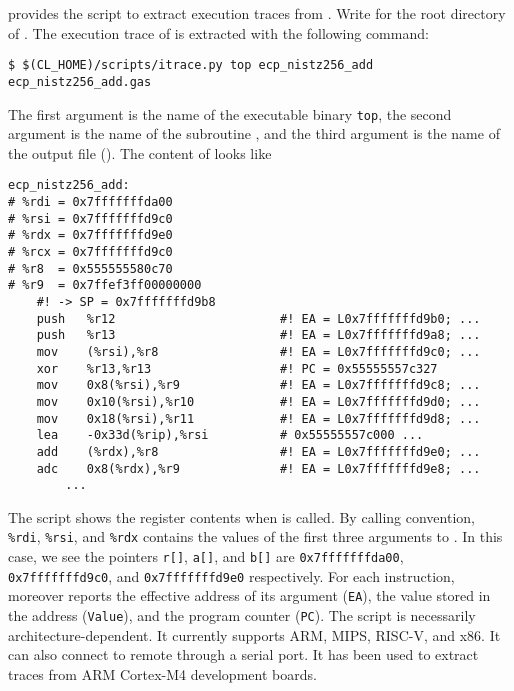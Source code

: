 \documentclass{amsproc}
\begin{document}
\cryptoline provides the \python script \itrace to extract execution
traces from \gdb. Write \cryptolinehome for the root directory of
\cryptoline. The execution trace of \nistzadd is extracted with the
following command:
\begin{verbatim}
$ $(CL_HOME)/scripts/itrace.py top ecp_nistz256_add ecp_nistz256_add.gas
\end{verbatim}
The first argument is the name of the executable binary \texttt{top},
the second argument is the name of the subroutine \nistzadd, and the
third argument is the name of the output file
(\nistzaddgas). The content of \nistzaddgas looks like
\begin{verbatim}
ecp_nistz256_add:
# %rdi = 0x7fffffffda00
# %rsi = 0x7fffffffd9c0
# %rdx = 0x7fffffffd9e0
# %rcx = 0x7fffffffd9c0
# %r8  = 0x555555580c70
# %r9  = 0x7ffef3ff00000000
	#! -> SP = 0x7fffffffd9b8
	push   %r12                       #! EA = L0x7fffffffd9b0; ...
	push   %r13                       #! EA = L0x7fffffffd9a8; ...
	mov    (%rsi),%r8                 #! EA = L0x7fffffffd9c0; ...
	xor    %r13,%r13                  #! PC = 0x55555557c327
	mov    0x8(%rsi),%r9              #! EA = L0x7fffffffd9c8; ...
	mov    0x10(%rsi),%r10            #! EA = L0x7fffffffd9d0; ...
	mov    0x18(%rsi),%r11            #! EA = L0x7fffffffd9d8; ...
	lea    -0x33d(%rip),%rsi          # 0x55555557c000 ...
	add    (%rdx),%r8                 #! EA = L0x7fffffffd9e0; ...
	adc    0x8(%rdx),%r9              #! EA = L0x7fffffffd9e8; ...
        ...
\end{verbatim}
The script \itrace shows the register contents when \nistzadd is
called. By calling convention, \texttt{\%rdi}, \texttt{\%rsi}, and
\texttt{\%rdx} contains the values of the first three arguments to
\nistzadd. In this case, we see the pointers \texttt{r[]},
\texttt{a[]}, and \texttt{b[]} are \texttt{0x7fffffffda00}, 
\texttt{0x7fffffffd9c0}, and \texttt{0x7fffffffd9e0}
respectively. For each instruction, \itrace moreover reports the
effective address of its argument (\texttt{EA}), the value stored in
the address (\texttt{Value}), and the program counter (\texttt{PC}). 
The \itrace script is necessarily architecture-dependent. It currently
supports ARM, MIPS, RISC-V, and x86. It can also connect to remote
\gdb through a serial port. It has been used to extract traces from
ARM Cortex-M4 development boards.
\end{document}
